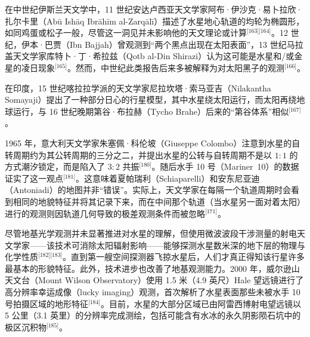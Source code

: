 在中世纪伊斯兰天文学中，11 世纪安达卢西亚天文学家阿布·伊沙克·易卜拉欣·扎尔卡里（Abū Ishāq Ibrāhīm al-Zarqālī）描述了水星地心轨道的均轮为椭圆形，如同鸡蛋或松子一般，尽管这一洞见并未影响他的天文理论或计算\(^\text{[163][164]}\)。12 世纪，伊本·巴贾（Ibn Bajjah）曾观测到“两个黑点出现在太阳表面”，13 世纪马拉盖天文学家库特卜·丁·希拉兹（Qotb al-Din Shirazi）认为这可能是水星和/或金星的凌日现象\(^\text{[165]}\)。然而，中世纪此类报告后来多被解释为对太阳黑子的观测\(^\text{[166]}\)。

在印度，15 世纪喀拉拉学派的天文学家尼拉坎塔·索马亚吉（Nilakantha Somayaji）提出了一种部分日心的行星模型，其中水星绕太阳运行，而太阳再绕地球运行，与 16 世纪晚期第谷·布拉赫（Tycho Brahe）后来的“第谷体系”相似\(^\text{[167]}\)。

1965 年，意大利天文学家朱塞佩·科伦坡（Giuseppe Colombo）注意到水星的自转周期约为其公转周期的三分之二，并提出水星的公转与自转周期不是以 \(1:1\) 的方式潮汐锁定，而是陷入了 \(3:2\) 共振\(^\text{[180]}\)。随后水手 10 号（Mariner~10）的数据证实了这一观点\(^\text{[181]}\)。这意味着夏帕瑞利（Schiaparelli）和安东尼亚迪（Antoniadi）的地图并非“错误”。实际上，天文学家在每隔一个轨道周期时会看到相同的地貌特征并将其记录下来，而在中间那个轨道（当水星另一面对着太阳）进行的观测则因轨道几何导致的极差观测条件而被忽略\(^\text{[171]}\)。

尽管地基光学观测并未显著推进对水星的理解，但使用微波波段干涉测量的射电天文学家——该技术可消除太阳辐射影响——能够探测水星数米深的地下层的物理与化学性质\(^\text{[182][183]}\)。直到第一艘空间探测器飞掠水星后，人们才真正得知该行星许多最基本的形貌特征。此外，技术进步也改善了地基观测能力。2000 年，威尔逊山天文台（Mount Wilson Observatory）使用 1.5 米（4.9 英尺）Hale 望远镜进行了高分辨率幸运成像（lucky imaging）观测，首次解析了水星表面那些未被水手 10 号拍摄区域的地形特征\(^\text{[184]}\)。目前，水星的大部分区域已由阿雷西博射电望远镜以 5 公里（3.1 英里）的分辨率完成测绘，包括可能含有水冰的永久阴影陨石坑中的极区沉积物\(^\text{[185]}\)。











